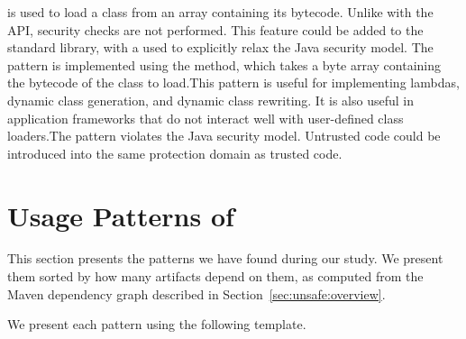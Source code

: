 %
{\smu{} is used to load a class from an array containing its bytecode. Unlike
with the  API, security checks are not performed.}
{This feature could be added to the standard library, with a
   used to explicitly relax the Java security model.}
{The pattern is implemented using the  method, which
takes a byte array containing the bytecode of the class to load.}{This pattern is useful for implementing lambdas, dynamic
class generation, and dynamic class rewriting. It is also useful in application
frameworks that do not interact well with user-defined class loaders.}{The
pattern violates the Java security model. Untrusted code could be introduced
into the same protection domain as trusted code.}

\section{Usage Patterns of \smu{}}
\label{sec:unsafe:patterns}

This section presents the patterns we have found during our study.
We present them sorted by how many artifacts depend on them, as computed from
the Maven dependency graph described in Section~\ref{sec:unsafe:overview}.



We present each pattern using the following template.
\medskip

